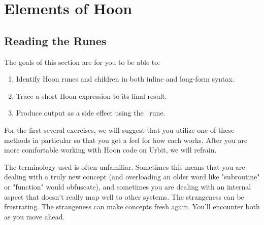 \setchapterpreamble[u]{\margintoc}
\chapter{Elements of Hoon}


\section{Reading the Runes}

The goals of this section are for you to be able to:

\begin{enumerate}
  \item  Identify Hoon runes and children in both inline and long-form syntax.
  \item  Trace a short Hoon expression to its final result.
  \item  Produce output as a side effect using the \sigpam~rune.
\end{enumerate}


For the first several exercises, we will suggest that you utilize one of these methods in particular so that you get a feel for how each works.  After you are more comfortable working with Hoon code on Urbit, we will refrain.


The terminology used is often unfamiliar.  Sometimes this means that you are dealing with a truly new concept (and overloading an older word like "subroutine" or "function" would obfuscate), and sometimes you are dealing with an internal aspect that doesn't really map well to other systems.  The strangeness can be frustrating.  The strangeness can make concepts fresh again.  You'll encounter both as you move ahead.


